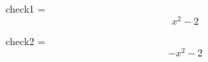 \documentclass{article}
\begin{document}
check1 = 
    $$ x^{2} - 2 $$
    

check2 = 
    $$ - x^{2} - 2 $$
    
\end{document}
